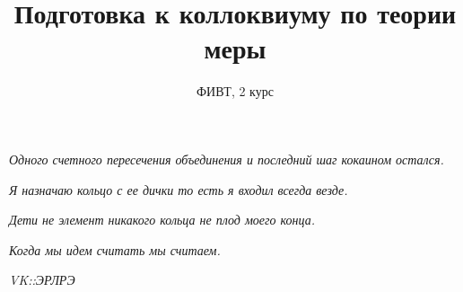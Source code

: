 \documentclass[12pt,a4paper]{article}
\title{Подготовка к коллоквиуму по теории меры}
\author{ФИВТ, 2 курс}
\theoremstyle{plain}
\theoremstyle{definition}
\begin{document}
\tracingall
\maketitle
\epigraph{\textit{Одного счетного пересечения объединения и последний шаг кокаином остался.}}{}
\epigraph{\textit{Я назначаю кольцо с ее дички то есть я входил всегда везде.}}{}
\epigraph{\textit{Дети не элемент никакого кольца не плод моего конца.}}{}
\epigraph{\textit{Когда мы идем считать мы считаем.}}{\textit{VK::ЭРЛРЭ}}
\newpage
\tableofcontents


%
%
%
%
%
%
%
%
%
%

%
%
%
%
%
%
%
%
%

%
%
%
%
%
%
%
%
%
\end{document}
